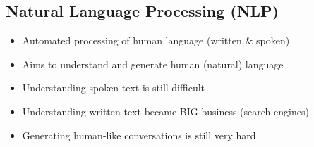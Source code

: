 \subsection{Natural Language Processing (NLP)}
\begin{itemize}
    \item Automated processing of human language (written \& spoken)
    \item Aims to understand and generate human (natural) language
    \item Understanding spoken text is still difficult
    \item Understanding written text became BIG business (search-engines)
    \item Generating human-like conversations is still very hard
\end{itemize}

